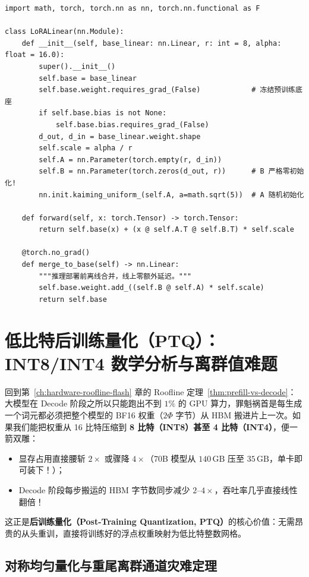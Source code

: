 \begin{lstlisting}[caption={支持 $B=0$ 初始化与离线零延迟合并的 PyTorch LoRA 线性层核心实现。},label={lst:lora-code}]
import math, torch, torch.nn as nn, torch.nn.functional as F

class LoRALinear(nn.Module):
    def __init__(self, base_linear: nn.Linear, r: int = 8, alpha: float = 16.0):
        super().__init__()
        self.base = base_linear
        self.base.weight.requires_grad_(False)            # 冻结预训练底座
        if self.base.bias is not None:
            self.base.bias.requires_grad_(False)
        d_out, d_in = base_linear.weight.shape
        self.scale = alpha / r
        self.A = nn.Parameter(torch.empty(r, d_in))
        self.B = nn.Parameter(torch.zeros(d_out, r))      # B 严格零初始化!
        nn.init.kaiming_uniform_(self.A, a=math.sqrt(5))  # A 随机初始化

    def forward(self, x: torch.Tensor) -> torch.Tensor:
        return self.base(x) + (x @ self.A.T @ self.B.T) * self.scale

    @torch.no_grad()
    def merge_to_base(self) -> nn.Linear:
        """推理部署前离线合并，线上零额外延迟。"""
        self.base.weight.add_((self.B @ self.A) * self.scale)
        return self.base
\end{lstlisting}

\section{低比特后训练量化（PTQ）：INT8/INT4 数学分析与离群值难题}
\label{sec:quantization}

回到第~\ref{ch:hardware-roofline-flash} 章的 Roofline 定理~\ref{thm:prefill-vs-decode}：大模型在 Decode 阶段之所以只能跑出不到 $1\%$ 的 GPU 算力，罪魁祸首是每生成一个词元都必须把整个模型的 BF16 权重（$2\Phi$ 字节）从 HBM 搬进片上一次。如果我们能把权重从 16 比特压缩到 \textbf{8 比特（INT8）甚至 4 比特（INT4）}，便一箭双雕：
\begin{itemize}
  \item 显存占用直接腰斩 $2\times$ 或骤降 $4\times$（70B 模型从 $140\,\mathrm{GB}$ 压至 $35\,\mathrm{GB}$，单卡即可装下！）；
  \item Decode 阶段每步搬运的 HBM 字节数同步减少 $2\text{--}4\times$，吞吐率几乎直接线性翻倍！
\end{itemize}
这正是\textbf{后训练量化（Post-Training Quantization, PTQ）}的核心价值：无需昂贵的从头重训，直接将训练好的浮点权重映射为低比特整数网格。

\subsection{对称均匀量化与重尾离群通道灾难定理}

